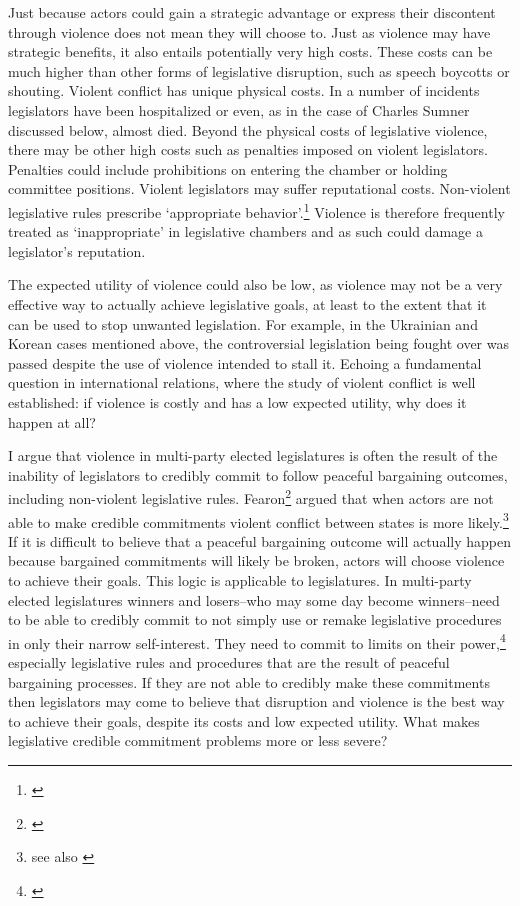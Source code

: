 \documentclass[a4paper]{article}\usepackage[]{graphicx}\usepackage[]{color}
\begin{document}
Just because actors could gain a strategic advantage or express their discontent through violence does not mean they will choose to. Just as violence may have strategic benefits, it also entails potentially very high costs. These costs can be much higher than other forms of legislative disruption, such as speech boycotts or shouting. Violent conflict has unique physical costs. In a number of incidents legislators have been hospitalized or even, as in the case of Charles Sumner discussed below, almost died. Beyond the physical costs of legislative violence, there may be other high costs such as penalties imposed on violent legislators. Penalties could include prohibitions on entering the chamber or holding committee positions. Violent legislators may suffer reputational costs. Non-violent legislative rules prescribe `appropriate behavior'.\footnote{\citealt{March2008}} Violence is therefore frequently treated as `inappropriate' in legislative chambers and as such could damage a legislator's reputation. 

The expected utility of violence could also be low, as violence may not be a very effective way to actually achieve legislative goals, at least to the extent that it can be used to stop unwanted legislation. For example, in the Ukrainian and Korean cases mentioned above, the controversial legislation being fought over was passed despite the use of violence intended to stall it. Echoing a fundamental question in international relations, where the study of violent conflict is well established: if violence is costly and has a low expected utility, why does it happen at all? 

I argue that violence in multi-party elected legislatures is often the result of the inability of legislators to credibly commit to follow peaceful bargaining outcomes, including non-violent legislative rules. Fearon\footnote{\citealt{Fearon1995}} argued that when actors are not able to make credible commitments violent conflict between states is more likely.\footnote{see also \citealt{Powell2006}} If it is difficult to believe that a peaceful bargaining outcome will actually happen because bargained commitments will likely be broken, actors will choose violence to achieve their goals. This logic is applicable to legislatures. In multi-party elected legislatures winners and losers--who may some day become winners--need to be able to credibly commit to not simply use or remake legislative procedures in only their narrow self-interest. They need to commit to limits on their power,\footnote{\citealt{Gaubatz1996,riker1982}} especially legislative rules and procedures that are the result of peaceful bargaining processes. If they are not able to credibly make these commitments then legislators may come to believe that disruption and violence is the best way to achieve their goals, despite its costs and low expected utility. What makes legislative credible commitment problems more or less severe? 
\end{document}
